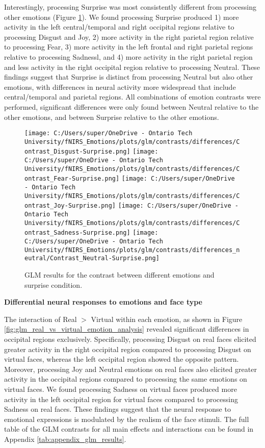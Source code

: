Interestingly, processing Surprise was most consistently different from processing other emotions (Figure \ref{fig:glm_emotion_analysis_surprise}). 
We found processing Surprise produced 1) more activity in the left central/temporal and right occipital regions relative to processing Disgust and Joy, 
2) more activity in the right parietal region relative to processing Fear, 3) more activity in the left frontal and right parietal regions relative to processing Sadnessl, and
4) more activity in the right parietal region and less activity in the right occipital region relative to processing Neutral.
These findings suggest that Surprise is distinct from processing Neutral but also other emotions, with differences in neural activity more widespread that include central/temporal and parietal regions. 
All combinations of emotion contrasts were performed, significant differences were only found between Neutral relative to the other emotions, and between Surprise relative to the other emotions.

\begin{figure}[H]
    \centering
      \texttt{[image: C:/Users/super/OneDrive - Ontario Tech University/fNIRS\_Emotions/plots/glm/contrasts/differences/Contrast\_Disgust-Surprise.png]}
      \texttt{[image: C:/Users/super/OneDrive - Ontario Tech University/fNIRS\_Emotions/plots/glm/contrasts/differences/Contrast\_Fear-Surprise.png]}
      \texttt{[image: C:/Users/super/OneDrive - Ontario Tech University/fNIRS\_Emotions/plots/glm/contrasts/differences/Contrast\_Joy-Surprise.png]}
      \texttt{[image: C:/Users/super/OneDrive - Ontario Tech University/fNIRS\_Emotions/plots/glm/contrasts/differences/Contrast\_Sadness-Surprise.png]}
      \texttt{[image: C:/Users/super/OneDrive - Ontario Tech University/fNIRS\_Emotions/plots/glm/contrasts/differences\_neutral/Contrast\_Neutral-Surprise.png]}
      \caption[GLM: Emotion vs. Surprise]{GLM results for the contrast between different emotions and surprise condition.}
      \label{fig:glm_emotion_analysis_surprise}
\end{figure}

\noindent
\textbf{Differential neural responses to emotions and face type}

The interaction of Real $>$ Virtual within each emotion, as shown in Figure \ref{fig:glm_real_vs_virtual_emotion_analysis} revealed significant differences in occipital regions exclusively.
Specifically, processing Disgust on real faces elicited greater activity in the right occipital region compared to processing Disgust on virtual faces, whereas the left occipital region showed the opposite pattern.
Moreover, processing Joy and Neutral emotions on real faces also elicited greater activity in the occipital regions compared to processing the same emotions on virtual faces.
We found processing Sadness on virtual faces produced more activity in the left occipital region for virtual faces compared to processing Sadness on real faces. 
These findings suggest that the neural response to emotional expressions is modulated by the realism of the face stimuli. 
The full table of the GLM contrasts for all main effects and interactions can be found in Appendix \ref{tab:appendix_glm_results}.

